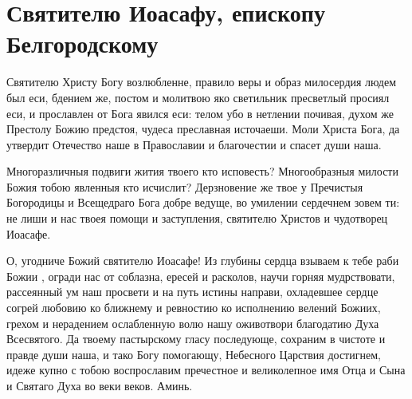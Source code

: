 \section{Святителю Иоасафу, епископу Белгородскому}\begin{mymulticols}


Святителю Христу Богу возлюбленне, правило веры и образ милосердия людем был еси, бдением же, постом и молитвою яко светильник пресветлый просиял еси, и прославлен от Бога явился еси: телом убо в нетлении почивая, духом же Престолу Божию предстоя, чудеса преславная источаеши. Моли Христа Бога, да утвердит Отечество наше в Православии и благочестии и спасет души наша.


Многоразличныя подвиги жития твоего кто исповесть? Многообразныя милости Божия тобою явленныя кто исчислит? Дерзновение же твое у Пречистыя Богородицы и Всещедраго Бога добре ведуще, во умилении сердечнем зовем ти: не лиши и нас твоея помощи и заступления, святителю Христов и чудотворец Иоасафе.


О, угодниче Божий святителю Иоасафе! Из глубины сердца взываем к тебе раби Божии , огради нас от соблазна, ересей и расколов, научи горняя мудрствовати, рассеянный ум наш просвети и на путь истины направи, охладевшее сердце согрей любовию ко ближнему и ревностию ко исполнению велений Божиих, грехом и нерадением ослабленную волю нашу оживотвори благодатию Духа Всесвятого. Да твоему пастырскому гласу последующе, сохраним в чистоте и правде души наша, и тако Богу помогающу, Небесного Царствия достигнем, идеже купно с тобою воспрославим пречестное и великолепное имя Отца и Сына и Святаго Духа во веки веков. Аминь.

\end{mymulticols}

\mychapterending


